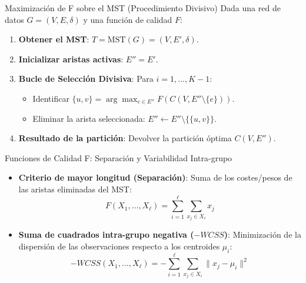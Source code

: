 \documentclass[
  ignorenonframetext,
]{beamer}
\providecommand{\tightlist}{%
  \setlength{\itemsep}{0pt}\setlength{\parskip}{0pt}}
\begin{document}
\begin{frame}{Maximización de F sobre el MST (Procedimiento Divisivo)}
\label{maximizaciuxf3n-de-f-sobre-el-mst-procedimiento-divisivo}
Dada una red de datos \(G = (V, E, \delta)\) y una función de calidad
\(F\):

\begin{enumerate}
\tightlist
\item
  \textbf{Obtener el MST}: \(T = \text{MST}(G) = (V, E', \delta)\).
\item
  \textbf{Inicializar aristas activas}: \(E'' = E'\).
\item
  \textbf{Bucle de Selección Divisiva}: Para \(i = 1, \dots, K - 1\):

  \begin{itemize}
  \tightlist
  \item
    Identificar
    \(\{u, v\} = \arg\max_{e \in E''} F(C(V, E'' \setminus \{e\}))\).
  \item
    Eliminar la arista seleccionada:
    \(E'' \leftarrow E'' \setminus \{\{u, v\}\}\).
  \end{itemize}
\item
  \textbf{Resultado de la partición}: Devolver la partición óptima
  \(C(V, E'')\).
\end{enumerate}
\end{frame}

\begin{frame}{Funciones de Calidad F: Separación y Variabilidad
Intra-grupo}
\label{funciones-de-calidad-f-separaciuxf3n-y-variabilidad-intra-grupo}
\begin{itemize}
\item
  \textbf{Criterio de mayor longitud (Separación)}: Suma de los
  costes/pesos de las aristas eliminadas del MST: \[
  F(X_1, \dots, X_\ell) = \sum_{i=1}^\ell \sum_{x_j \in X_i} x_j
  \]
\item
  \textbf{Suma de cuadrados intra-grupo negativa (\(-WCSS\))}:
  Minimización de la dispersión de las observaciones respecto a los
  centroides \(\mu_i\): \[
  -WCSS(X_1, \dots, X_\ell) = -\sum_{i=1}^\ell \sum_{x_j \in X_i} \|x_j - \mu_i\|^2
  \]
\end{itemize}
\end{frame}
\end{document}
